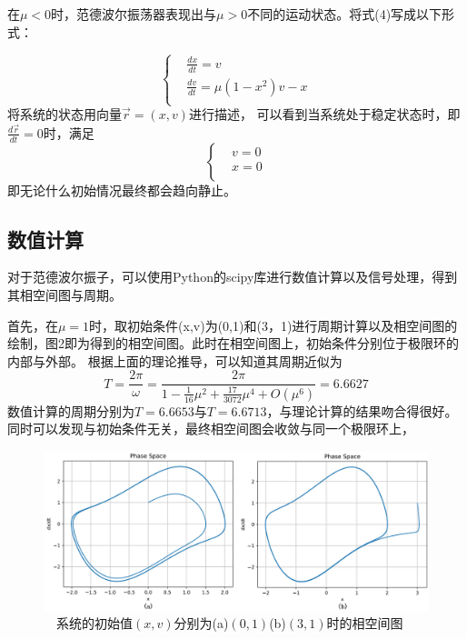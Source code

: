 \documentclass[10.5pt,oneside,a4paper]{article}
\theoremstyle{mystyle}
\begin{document}
在$\mu<0$时，范德波尔振荡器表现出与$\mu>0$不同的运动状态。将式(4)写成以下形式：

\begin{equation} 
    \left \{
    \begin{aligned}
    &\frac{dx}{dt}=v\\
    &\frac{dv}{dt}=\mu(1-x^2)v-x\\
    \end{aligned}
    \right.
\end{equation}
将系统的状态用向量$\vec{r}=(x,v)$进行描述，
可以看到当系统处于稳定状态时，即$\frac{d\vec{r}}{dt}=0$时，满足
\begin{equation} 
    \left \{
    \begin{aligned}
    &v=0\\
    &x=0\\
    \end{aligned}
    \right.
\end{equation}
即无论什么初始情况最终都会趋向静止。

\subsection{数值计算}

对于范德波尔振子，可以使用Python的scipy库进行数值计算以及信号处理，得到其相空间图与周期。

首先，在$\mu=1$时，取初始条件(x,v)为(0,1)和(3，1)进行周期计算以及相空间图的绘制，图2即为得到的相空间图。此时在相空间图上，初始条件分别位于极限环的内部与外部。
根据上面的理论推导，可以知道其周期近似为
\begin{equation}
    T=\frac{2\pi}{\omega}=\frac{2\pi}{1-\frac{1}{16}\mu^2+\frac{17}{3072}\mu^4+O(\mu^6)}=6.6627
\end{equation}
数值计算的周期分别为$T=6.6653$与$T=6.6713$，与理论计算的结果吻合得很好。同时可以发现与初始条件无关，最终相空间图会收敛与同一个极限环上，

\begin{figure}
    \centering
    \includegraphics[width=0.8\linewidth]{1inout.png}
    \caption{$\quad$系统的初始值$(x,v)$分别为(a)$(0,1)$(b)$(3,1)$时的相空间图}
\end{figure}
  
\end{document}
